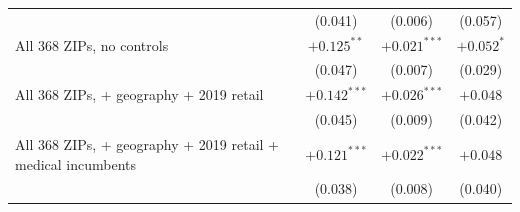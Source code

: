 \begin{tabular}{@{}lccc@{}}
 & (0.041) & (0.006) & (0.057) \\
All 368 ZIPs, no controls & $+0.125^{**}$ & $+0.021^{***}$ & $+0.052^{*}$ \\
 & (0.047) & (0.007) & (0.029) \\
All 368 ZIPs, + geography + 2019 retail & $+0.142^{***}$ & $+0.026^{***}$ & $+0.048$ \\
 & (0.045) & (0.009) & (0.042) \\
All 368 ZIPs, + geography + 2019 retail + medical incumbents & $+0.121^{***}$ & $+0.022^{***}$ & $+0.048$ \\
 & (0.038) & (0.008) & (0.040) \\
\bottomrule
\end{tabular}
